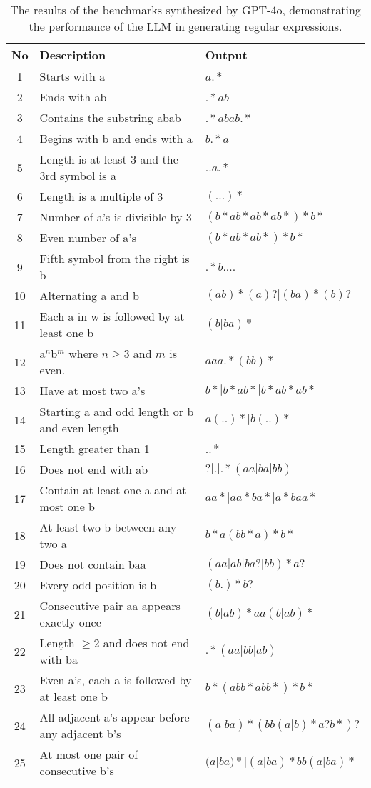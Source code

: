 \begin{table}[h!]
	\centering
	\caption{The results of the benchmarks synthesized by GPT-4o, demonstrating the performance of the LLM in generating regular expressions.}
	\label{tab:llm_outputs}
	\begin{tabular}{|c|l|l|}
	\hline
	\textbf{No} & \textbf{Description} & \textbf{Output} \\
	\hline
	1 & Starts with a & $a.*$  \\
	2 & Ends with ab & $.*ab$ \\
	3 & Contains the substring abab & $.*abab.*$ \\
	4 & Begins with b and ends with a & $b.*a$ \\
	5 & Length is at least 3 and the 3rd symbol is a & $..a.*$ \\
	6 & Length is a multiple of 3 & $(...)*$ \\
	7 & Number of a's is divisible by 3 & $(b*ab*ab*ab*)*b*$ \\
	8 & Even number of a's & $(b*ab*ab*)*b*$ \\
	9 & Fifth symbol from the right is b & $.*b....$ \\
	10 & Alternating a and b & $(ab)*(a)?|(ba)*(b)?$ \\
	11 & Each a in w is followed by at least one b & $(b|ba)*$ \\
	12 & a$^n$b$^m$ where $n \geq 3$ and $m$ is even. & $aaa.*(bb)*$ \\
	13 & Have at most two a's & $b*|b*ab*|b*ab*ab*$ \\ 
	14 & Starting a and odd length or b and even length & $a(..)* | b(..)*$ \\ %
	15 & Length greater than 1 & $..*$ \\ %
	16 & Does not end with ab & $?|.|.*(aa|ba|bb)$ \\ %
	17 & Contain at least one a and at most one b & $aa*|aa*ba*|a*baa*$ \\
	18 & At least two b between any two a & $b*a(bb*a)*b*$ \\ %
	19 & Does not contain baa & $(aa|ab|ba?|bb)*a?$ \\ %
	20 & Every odd position is b & $(b.)*b?$ \\
	21 & Consecutive pair aa appears exactly once & $(b|ab)*aa(b|ab)*$ \\ %
	22 & Length $\ge 2$ and does not end with ba & $.*(aa|bb|ab)$ \\
	23 & Even a's, each a is followed by at least one b & $b*(abb*abb*)*b*$ \\ %
	24 & All adjacent a's appear before any adjacent b's & $(a|ba)*(bb(a|b)*a?b*)?$ \\ %
	25 & At most one pair of consecutive b's & $(a|ba)* | (a|ba)*bb(a|ba)*$ \\ %
	\hline
\end{tabular}
\end{table}

